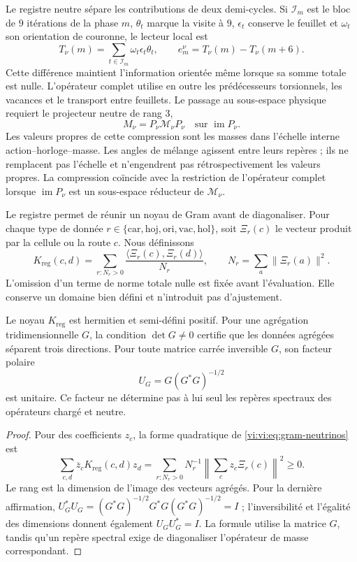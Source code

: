 Le registre neutre sépare les contributions de deux demi-cycles. Si
\(\mathcal I_m\) est le bloc de \(9\) itérations de la phase \(m\),
\(\theta_t\) marque la visite à \(9\), \(\epsilon_t\) conserve le feuillet
et \(\omega_t\) son orientation de couronne, le lecteur local est
\[
 T_\nu(m)=\sum_{t\in\mathcal I_m}\omega_t\epsilon_t\theta_t,
 \qquad e_m^\nu=T_\nu(m)-T_\nu(m+6).
\]
Cette différence maintient l’information orientée même lorsque sa somme
totale est nulle. L’opérateur complet utilise en outre les prédécesseurs
torsionnels, les vacances et le transport entre feuillets. Le passage au
sous-espace physique requiert le projecteur neutre de rang \(3\),
\[
 M_\nu=P_\nu\mathcal M_\nu P_\nu
 \quad\text{sur }\operatorname{im}P_\nu.
\]
Les valeurs propres de cette compression sont les masses dans l’échelle interne
action--horloge--masse. Les angles de mélange agissent entre leurs repères ;
ils ne remplacent pas l’échelle et n’engendrent pas rétrospectivement les valeurs propres.
La compression coïncide avec la restriction de l’opérateur complet lorsque
\(\operatorname{im}P_\nu\) est un sous-espace réducteur de
\(\mathcal M_\nu\).

Le registre permet de réunir un noyau de Gram avant de diagonaliser.
Pour chaque type de donnée
\(r\in\{\mathrm{car},\mathrm{hoj},\mathrm{ori},\mathrm{vac},\mathrm{hol}\}\),
soit \(\Xi_r(c)\) le vecteur produit par la cellule ou la route \(c\).
Nous définissons
\begin{equation}
 K_{\mathrm{reg}}(c,d)=
 \sum_{r:N_r>0}\frac{\langle\Xi_r(c),\Xi_r(d)\rangle}{N_r},
 \qquad N_r=\sum_a\|\Xi_r(a)\|^2.
 \label{vi:vi:eq:gram-neutrinos}
\end{equation}
L’omission d’un terme de norme totale nulle est fixée avant
l’évaluation. Elle conserve un domaine bien défini et n’introduit pas d’ajustement.

\begin{proposition}
\label{vi:vi:prop:gram-neutrinos}
Le noyau \(K_{\mathrm{reg}}\) est hermitien et semi-défini positif.
Pour une agrégation tridimensionnelle \(G\), la condition \(\det G\ne0\)
certifie que les données agrégées séparent trois directions. Pour toute
matrice carrée inversible \(G\), son facteur polaire
\[
 U_G=G(G^*G)^{-1/2}
\]
est unitaire. Ce facteur ne détermine pas à lui seul les repères spectraux
des opérateurs chargé et neutre.
\end{proposition}
\begin{proof}
Pour des coefficients \(z_c\), la forme quadratique de
\eqref{vi:vi:eq:gram-neutrinos} est
\[
 \sum_{c,d}\overline z_cK_{\mathrm{reg}}(c,d)z_d
 =\sum_{r:N_r>0}N_r^{-1}
 \left\|\sum_c z_c\Xi_r(c)\right\|^2\ge0.
\]
Le rang est la dimension de l’image des vecteurs agrégés. Pour la
dernière affirmation,
\(U_G^*U_G=(G^*G)^{-1/2}G^*G(G^*G)^{-1/2}=I\) ;
l’inversibilité et l’égalité des dimensions donnent également \(U_GU_G^*=I\).
La formule utilise la matrice \(G\), tandis qu’un repère spectral exige de
diagonaliser l’opérateur de masse correspondant.
\end{proof}

